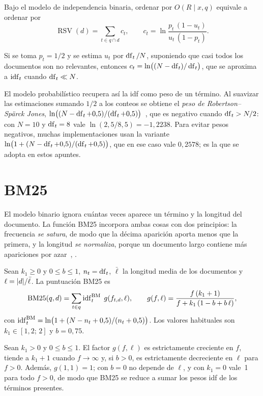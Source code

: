 \begin{proposicion}\label{prop:rsv}
Bajo el modelo de independencia binaria, ordenar por $O(R\mid x,q)$ equivale a ordenar por
\[
\operatorname{RSV}(d)=\sum_{t\in q\cap d}c_t,\qquad c_t=\ln\frac{p_t\,(1-u_t)}{u_t\,(1-p_t)} .
\]
\end{proposicion}

\begin{corolario}\label{cor:rsj}
Si se toma $p_t=1/2$ y se estima $u_t$ por $\operatorname{df}_t/N$, suponiendo que casi todos los documentos son no relevantes, entonces $c_t=\ln\bigl((N-\operatorname{df}_t)/\operatorname{df}_t\bigr)$, que se aproxima a $\operatorname{idf}_t$ cuando $\operatorname{df}_t\ll N$.
\end{corolario}

El modelo probabilístico recupera así la idf como peso de un término. Al suavizar las estimaciones sumando $1/2$ a los conteos se obtiene el \emph{peso de Robertson--Spärck Jones}, $\ln\bigl((N-\operatorname{df}_t+0{,}5)/(\operatorname{df}_t+0{,}5)\bigr)$~\cite{rz}, que es negativo cuando $\operatorname{df}_t>N/2$: con $N=10$ y $\operatorname{df}_t=8$ vale $\ln(2{,}5/8{,}5)=-1{,}2238$. Para evitar pesos negativos, muchas implementaciones usan la variante $\ln\bigl(1+(N-\operatorname{df}_t+0{,}5)/(\operatorname{df}_t+0{,}5)\bigr)$, que en ese caso vale $0{,}2578$; es la que se adopta en estos apuntes.

\section{BM25}

El modelo binario ignora cuántas veces aparece un término y la longitud del documento. La función BM25 incorpora ambas cosas con dos principios: la frecuencia \emph{se satura}, de modo que la décima aparición aporta menos que la primera, y la longitud \emph{se normaliza}, porque un documento largo contiene más apariciones por azar~\cite[§11.4.3]{iir}, \cite{rz}.

\begin{definicion}[BM25]\label{def:bm25}
Sean $k_1\ge 0$ y $0\le b\le 1$, $n_t=\operatorname{df}_t$, $\bar\ell$ la longitud media de los documentos y $\ell=\lvert d\rvert/\bar\ell$. La puntuación BM25 es
\[
\operatorname{BM25}(q,d)=\sum_{t\in q}\operatorname{idf}^{\mathrm{BM}}_t\;g(f_{t,d},\ell),\qquad
g(f,\ell)=\frac{f\,(k_1+1)}{f+k_1\,(1-b+b\,\ell)},
\]
con $\operatorname{idf}^{\mathrm{BM}}_t=\ln\bigl(1+(N-n_t+0{,}5)/(n_t+0{,}5)\bigr)$. Los valores habituales son $k_1\in[1{,}2;\,2]$ y $b=0{,}75$.
\end{definicion}

\begin{proposicion}\label{prop:bm25}
Sean $k_1>0$ y $0\le b\le 1$. El factor $g(f,\ell)$ es estrictamente creciente en $f$, tiende a $k_1+1$ cuando $f\to\infty$ y, si $b>0$, es estrictamente decreciente en $\ell$ para $f>0$. Además, $g(1,1)=1$; con $b=0$ no depende de $\ell$, y con $k_1=0$ vale~1 para todo $f>0$, de modo que BM25 se reduce a sumar los pesos idf de los términos presentes.
\end{proposicion}

